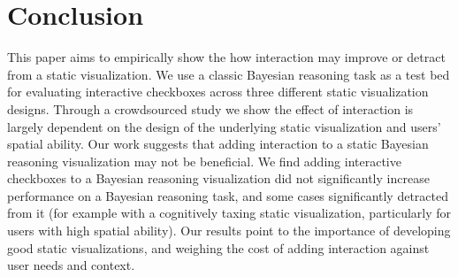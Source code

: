 \section{Conclusion} 
This paper aims to empirically show the how interaction may improve or detract from a static visualization. We use a classic Bayesian reasoning task as a test bed for evaluating interactive checkboxes across three different static visualization designs. Through a crowdsourced study we show the effect of interaction is largely dependent on the design of the underlying static visualization and users' spatial ability. 
Our work suggests that adding interaction to a static Bayesian reasoning visualization may not be beneficial. We find adding interactive checkboxes to a Bayesian reasoning visualization did not significantly increase performance on a Bayesian reasoning task, and some cases significantly detracted from it (for example with a cognitively taxing static visualization, particularly for users with high spatial ability). Our results point to the importance of developing good static visualizations, and weighing the cost of adding interaction against user needs and context. 





